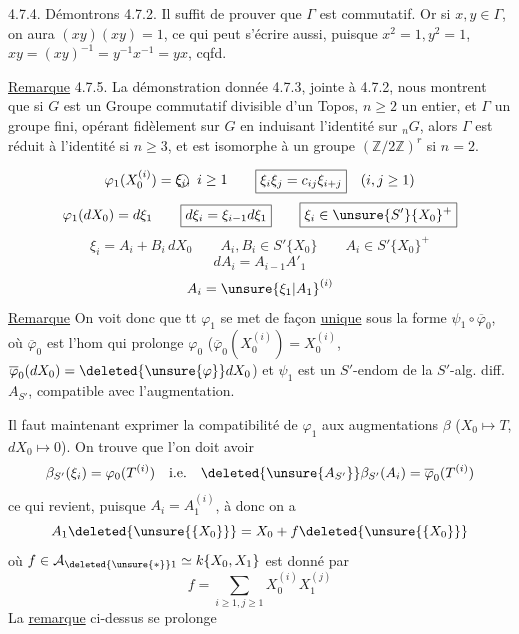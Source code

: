 4.7.4. Démontrons 4.7.2. Il suffit de prouver que $\Gamma$ est commutatif. Or si $x,y\in\Gamma$, on aura $(xy)(xy)=1$, ce qui peut s'écrire aussi, puisque $x^2=1,y^2=1$, $xy=(xy)^{-1}=y^{-1}x^{-1}=yx$, cqfd.

\uline{Remarque} 4.7.5. La démonstration donnée 4.7.3, jointe à 4.7.2, nous montrent que si $G$ est un Groupe commutatif divisible d'un Topos, $n\geq2$ un entier, et $\Gamma$ un groupe fini, opérant fidèlement sur $G$ en induisant l'identité sur ${}_nG$, alors $\Gamma$ est réduit à l'identité si $n\geq3$, et est isomorphe à un groupe $(\mathbb Z/2\mathbb Z)^r$ si $n=2$.

\[
\varphi_1(X_0^{(i)})=\text{\textcircled{$\xi_i,\ i\geq1$}}\qquad\boxed{\xi_i\xi_j=c_{ij}\xi_{i+j}}\quad(i,j\geq1)
\]
\[
\varphi_1(dX_0)=d\xi_1\qquad\boxed{d\xi_i=\xi_{i-1}d\xi_1}\qquad\boxed{\xi_i\in\unsure{S'}\{X_0\}^+}
\]
\[
\xi_i=A_i+B_i\,dX_0\qquad A_i,B_i\in S'\{X_0\}\qquad A_i\in S'\{X_0\}^+
\]
\[
dA_i=A_{i-1}A'_1
\]
\[
A_i=\unsure{\xi_1|A_1}^{(i)}
\]
\uline{Remarque} On voit donc que tt $\varphi_1$ se met de façon \uline{unique} sous la forme $\psi_1\circ\overline\varphi_0$, où $\overline\varphi_0$ est l'hom qui prolonge $\varphi_0$ ($\overline\varphi_0(X_0^{(i)})=X_0^{(i)}$, $\overline\varphi_0(dX_0)=\deleted{\unsure{\varphi}}dX_0$) et $\psi_1$ est un $S'$-endom de la $S'$-alg. diff. $A_{S'}$, compatible avec l'augmentation.

Il faut maintenant exprimer la compatibilité de $\varphi_1$ aux augmentations $\beta$  ($X_0\longmapsto T$,  $dX_0\longmapsto0$).
On trouve que l'on doit avoir
\[
\beta_{S'}(\xi_i)=\varphi_0(T^{(i)})\quad\text{i.e.}\quad\deleted{\unsure{A_{S'}}}\beta_{S'}(A_i)=\overline\varphi_0(T^{(i)})
\]
ce qui revient, puisque $A_i=A_1^{(i)}$, à
\inserted{\[
\left\{\begin{array}{l}
\beta_{S'}(A_1)=\overline\varphi_0(T)\\
\varphi_0(T^{(i)})=\varphi_0(T)^{(i)}
\end{array}\right.
\]}
donc on a
\[
A_1\deleted{\unsure{\{X_0\}}}=X_0+f\deleted{\unsure{\{X_0\}}}
\]
où $f\in\mathcal A_{\deleted{\unsure{*}}1}\simeq k\{X_0,X_1\}$ est donné par
\[
f=\sum_{i\geq1,j\geq1}X_0^{(i)}X_1^{(j)}
\]
La \uline{remarque} ci-dessus se prolonge 

